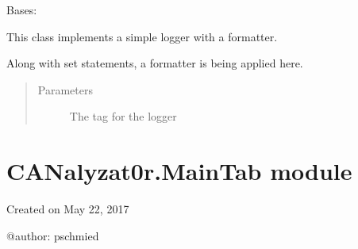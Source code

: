 \documentclass[letterpaper,10pt,english]{sphinxmanual}
\begin{document}
\begin{fulllineitems}
\label{\detokenize{src:src.Logger.Logger}}
Bases: 

This class implements a simple logger with a formatter.

\begin{fulllineitems}
\label{\detokenize{src:src.Logger.Logger.__init__}}
Along with set statements, a formatter is being applied here.
\begin{quote}\begin{description}
\item[{Parameters}] \leavevmode
{} \textendash{} The tag for the logger

\end{description}\end{quote}

\end{fulllineitems}


\begin{fulllineitems}
\label{\detokenize{src:src.Logger.Logger.getLogger}}
\end{fulllineitems}


\begin{fulllineitems}
\label{\detokenize{src:src.Logger.Logger.minLogLevel}}
\end{fulllineitems}


\end{fulllineitems}



\section{CANalyzat0r.MainTab module}
\label{\detokenize{src:canalyzat0r-maintab-module}}\label{\detokenize{src:module-src.MainTab}}
Created on May 22, 2017

@author: pschmied
\end{document}
